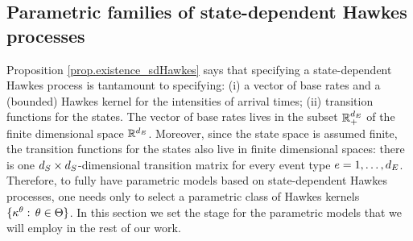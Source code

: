 \documentclass[10pt]{article}
\begin{document}
\subsection{Parametric families of state-dependent Hawkes processes}\label{sec.parametric_hawkes}
Proposition \ref{prop.existence_sdHawkes} says that specifying a state-dependent Hawkes process is tantamount to specifying: (i) a vector of base rates and a (bounded) Hawkes kernel for the intensities of arrival times; (ii) transition functions for the states. The vector of base rates lives in the subset $\mathbb{R}_{+}^{d_{E}}$ of the finite dimensional space $\mathbb{R}^{d_{E}}$. Moreover, since the state space is assumed finite, the transition functions for the states also live in finite dimensional spaces: there is one $d_{S}\times d_{S}$-dimensional transition matrix for every event type $e=1,\dots, d_{E}$. Therefore, to fully have parametric models based on state-dependent Hawkes processes, one needs only to select a parametric class of Hawkes kernels $\lbrace\kappa^\theta : \, \theta \in \Theta \rbrace$. In this section we set the stage for the parametric models that we will employ in the rest of our work. 
\end{document}
